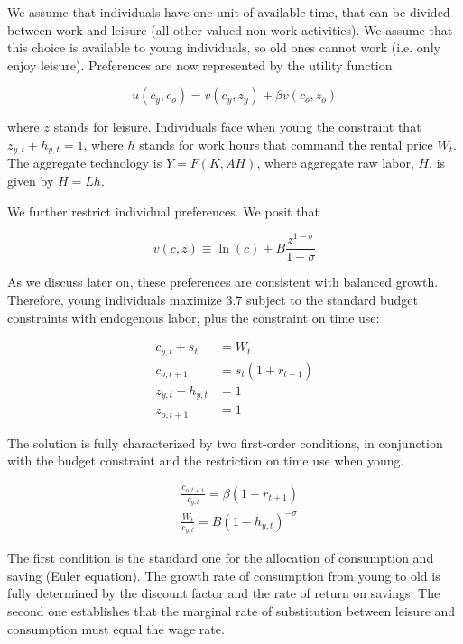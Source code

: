 \documentclass[10pt]{article}
\begin{document}
We assume that individuals have one unit of available time, that can be divided between work and leisure (all other valued non-work activities). We assume that this choice is available to young individuals, so old ones cannot work (i.e. only enjoy leisure). Preferences are now represented by the utility function


\begin{equation*}
u\left(c_{y}, c_{o}\right)=v\left(c_{y}, z_{y}\right)+\beta v\left(c_{o}, z_{o}\right) \tag{3.7}
\end{equation*}


where $z$ stands for leisure. Individuals face when young the constraint that $z_{y, t}+ h_{y, t}=1$, where $h$ stands for work hours that command the rental price $W_{t}$. The aggregate technology is $Y=F(K, A H)$, where aggregate raw labor, $H$, is given by $H=L h$.

We further restrict individual preferences. We posit that

$$
v(c, z) \equiv \ln (c)+B \frac{z^{1-\sigma}}{1-\sigma}
$$

As we discuss later on, these preferences are consistent with balanced growth. Therefore, young individuals maximize 3.7 subject to the standard budget constraints with endogenous labor, plus the constraint on time use:


\begin{align*}
c_{y, t}+s_{t} & =W_{t}  \tag{3.8}\\
c_{o, t+1} & =s_{t}\left(1+r_{t+1}\right)  \tag{3.9}\\
z_{y, t}+h_{y, t} & =1  \tag{3.10}\\
z_{o, t+1} & =1 \tag{3.11}
\end{align*}


The solution is fully characterized by two first-order conditions, in conjunction with the budget constraint and the restriction on time use when young.


\begin{align*}
& \frac{c_{o, t+1}}{c_{y, t}}=\beta\left(1+r_{t+1}\right)  \tag{3.12}\\
& \frac{W_{t}}{c_{y, t}}=B\left(1-h_{y, t}\right)^{-\sigma} \tag{3.13}
\end{align*}


The first condition is the standard one for the allocation of consumption and saving (Euler equation). The growth rate of consumption from young to old is fully determined by the discount factor and the rate of return on savings. The second one establishes that the marginal rate of substitution between leisure and consumption must equal the wage rate.
\end{document}
